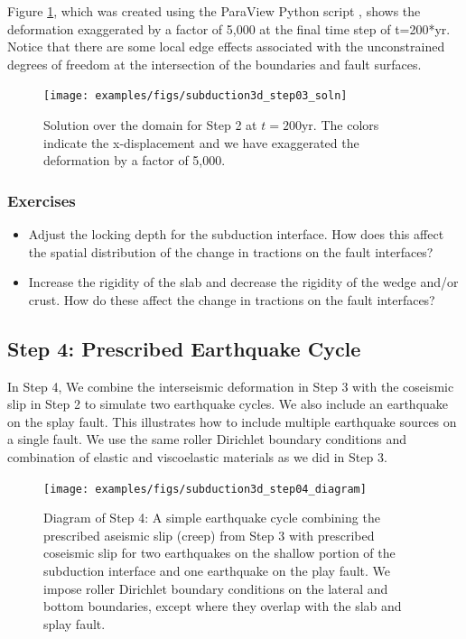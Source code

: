 Figure \ref{fig:example:subduction:3d:step03}, which was created
using the ParaView Python script , shows
the deformation exaggerated by a factor of 5,000 at the final time
step of t=200*yr. Notice that there are some local edge effects
associated with the unconstrained degrees of freedom at the
intersection of the boundaries and fault surfaces.

\begin{figure}
  \texttt{[image: examples/figs/subduction3d\_step03\_soln]}
  \caption{Solution over the domain for Step 2 at $t=200 \mathrm{yr}$. The colors indicate
    the x-displacement and we have exaggerated the
    deformation by a factor of 5,000.}
  \label{fig:example:subduction:3d:step03}
\end{figure}


\subsubsection{Exercises}

\begin{itemize}
\item Adjust the locking depth for the subduction interface. How does this
  affect the spatial distribution of the change in tractions on
  the fault interfaces?
\item Increase the rigidity of the slab and decrease the rigidity of
  the wedge and/or crust. How do these affect the change in tractions
  on the fault interfaces?
\end{itemize}


\subsection{Step 4: Prescribed Earthquake Cycle}

In Step 4, We combine the interseismic deformation in Step 3 with the
coseismic slip in Step 2 to simulate two earthquake cycles. We also
include an earthquake on the splay fault. This illustrates how to
include multiple earthquake sources on a single fault. We use the same
roller Dirichlet boundary conditions and combination of elastic and
viscoelastic materials as we did in Step 3.

\begin{figure}[htbp]
  \texttt{[image: examples/figs/subduction3d\_step04\_diagram]}
  \caption{Diagram of Step 4: A simple earthquake cycle combining the
    prescribed aseismic slip (creep) from Step 3 with prescribed
    coseismic slip for two earthquakes on the shallow portion of the
    subduction interface and one earthquake on the play fault. We
    impose roller Dirichlet boundary conditions on the lateral and
    bottom boundaries, except where they overlap with the slab and
    splay fault.}
  \label{fig:example:subduction:3d:step04:diagram}
\end{figure}

